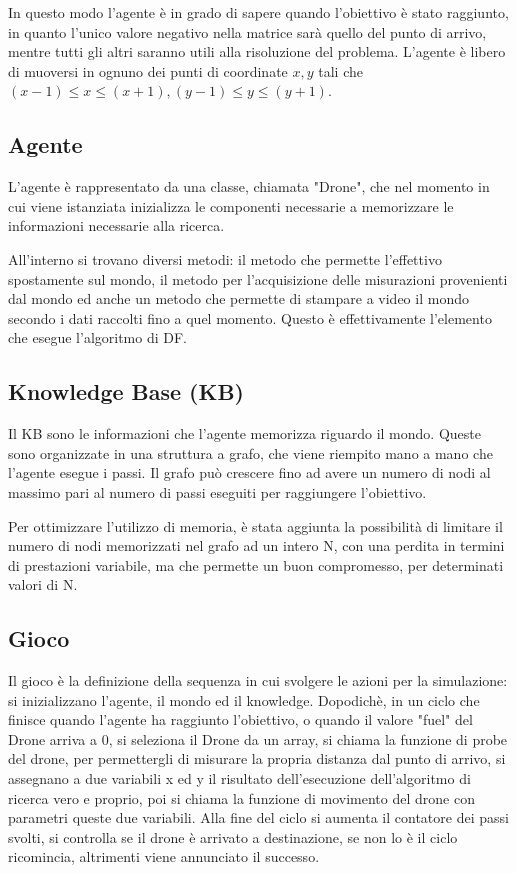In questo modo l'agente è in grado di sapere quando l'obiettivo è stato raggiunto, in quanto l'unico valore negativo nella matrice sarà quello del punto di arrivo, mentre tutti gli altri saranno utili alla risoluzione del problema.
L'agente è libero di muoversi in ognuno dei punti di coordinate $ x, y $ tali che $ (x-1) \le x \le (x+1), (y-1) \le y \le (y+1) $.

\subsection{Agente}
L'agente è rappresentato da una classe, chiamata "Drone", che nel momento in cui viene istanziata inizializza le componenti necessarie a memorizzare le informazioni necessarie alla ricerca. 

All'interno si trovano diversi metodi: il metodo che permette l'effettivo spostamente sul mondo, il metodo per l'acquisizione delle misurazioni provenienti dal mondo ed anche un metodo che permette di stampare a video il mondo secondo i dati raccolti fino a quel momento. Questo è effettivamente l'elemento che esegue l'algoritmo di DF.

\subsection{Knowledge Base (KB)}
Il KB sono le informazioni che l'agente memorizza riguardo il mondo. Queste sono organizzate in una struttura a grafo, che viene riempito mano a mano che l'agente esegue i passi. Il grafo può crescere fino ad avere un numero di nodi al massimo pari al numero di passi eseguiti per raggiungere l'obiettivo. 

Per ottimizzare l'utilizzo di memoria, è stata aggiunta la possibilità di limitare il numero di nodi memorizzati nel grafo ad un intero N, con una perdita in termini di prestazioni variabile, ma che permette un buon compromesso, per determinati valori di N.

\subsection{Gioco}
Il gioco è la definizione della sequenza in cui svolgere le azioni per la simulazione: si inizializzano l'agente, il mondo ed il knowledge. Dopodichè, in un ciclo che finisce quando l'agente ha raggiunto l'obiettivo, o quando il valore "fuel" del Drone arriva a 0, si seleziona il Drone da un array, si chiama la funzione di probe del drone, per permettergli di misurare la propria distanza dal punto di arrivo, si assegnano a due variabili x ed y il risultato dell'esecuzione dell'algoritmo di ricerca vero e proprio, poi si chiama la funzione di movimento del drone con parametri queste due variabili. Alla fine del ciclo si aumenta il contatore dei passi svolti, si controlla se il drone è arrivato a destinazione, se non lo è il ciclo ricomincia, altrimenti viene annunciato il successo.

